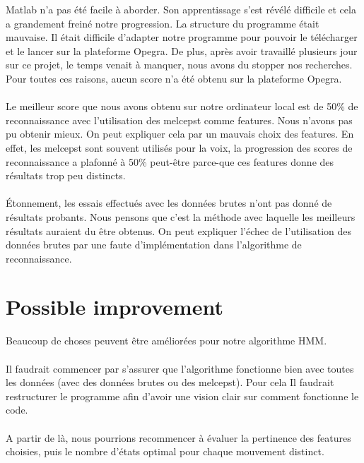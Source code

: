 Matlab n'a pas été facile à aborder. Son apprentissage s'est révélé difficile et cela a grandement freiné notre progression. La structure du programme était mauvaise. Il était difficile d'adapter notre programme pour pouvoir le télécharger et le lancer sur la plateforme Opegra. De plus, après avoir travaillé plusieurs jour sur ce projet, le temps venait à manquer, nous avons du stopper nos recherches. Pour toutes ces raisons, aucun score n'a été obtenu sur la plateforme Opegra.
\\
\\
Le meilleur score que nous avons obtenu sur notre ordinateur local est de 50\% de reconnaissance avec l'utilisation des melcepst comme features. Nous n'avons pas pu obtenir mieux. On peut expliquer cela par un mauvais choix des features. En effet, les melcepst sont souvent utilisés pour la voix, la progression des scores de reconnaissance a plafonné à 50\% peut-être parce-que ces features donne des résultats trop peu distincts.
\\
\\
Étonnement, les essais effectués avec les données brutes n'ont pas donné de résultats probants. Nous pensons que c'est la méthode avec laquelle les meilleurs résultats auraient du être obtenus. On peut expliquer l'échec de l'utilisation des données brutes par une faute d'implémentation dans l'algorithme de reconnaissance.


\section{Possible improvement}

Beaucoup de choses peuvent être améliorées pour notre algorithme HMM.
\\
\\
Il faudrait commencer par s'assurer que l'algorithme fonctionne bien avec toutes les données (avec des données brutes ou des melcepst).
Pour cela Il faudrait restructurer le programme afin d'avoir une vision clair sur comment fonctionne le code.
\\
\\
A partir de là, nous pourrions recommencer à évaluer la pertinence des features choisies, puis le nombre d'états optimal pour chaque mouvement distinct.







